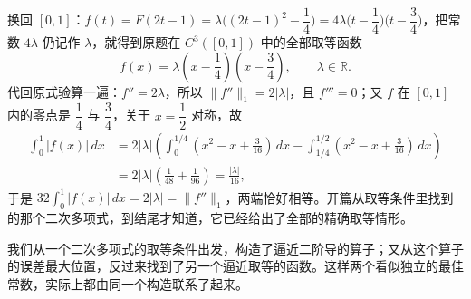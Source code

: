 \documentclass[UTF8,fontset=windows,a4paper,11pt]{ctexart}
\newcommand{\Lone}[1]{\lVert #1\rVert_1}
\begin{document}
换回 $[0,1]$：$f(t)=F(2t-1)=\lambda\bigl((2t-1)^2-\dfrac14\bigr)=4\lambda\bigl(t-\dfrac14\bigr)\bigl(t-\dfrac34\bigr)$，把常数 $4\lambda$ 仍记作 $\lambda$，就得到原题在 $C^3([0,1])$ 中的全部取等函数
\[
    f(x)=\lambda\left(x-\frac14\right)\left(x-\frac34\right),\qquad \lambda\in\mathbb{R}.
\]
代回原式验算一遍：$f''=2\lambda$，所以 $\Lone{f''}=2|\lambda|$，且 $f'''=0$；又 $f$ 在 $[0,1]$ 内的零点是 $\dfrac14$ 与 $\dfrac34$，关于 $x=\dfrac12$ 对称，故
\[
    \begin{aligned}
    \int_{0}^{1}|f(x)|\,dx
    &=2|\lambda|\left(\int_{0}^{1/4}\left(x^2-x+\frac3{16}\right)\,dx
      -\int_{1/4}^{1/2}\left(x^2-x+\frac3{16}\right)\,dx\right)\\
    &=2|\lambda|\left(\frac1{48}+\frac1{96}\right)
    =\frac{|\lambda|}{16},
    \end{aligned}
\]
于是 $32\displaystyle\int_0^1|f(x)|\,dx=2|\lambda|=\Lone{f''}$，两端恰好相等。开篇从取等条件里找到的那个二次多项式，到结尾才知道，它已经给出了全部的精确取等情形。

我们从一个二次多项式的取等条件出发，构造了逼近二阶导的算子；又从这个算子的误差最大位置，反过来找到了另一个逼近取等的函数。这样两个看似独立的最佳常数，实际上都由同一个构造联系了起来。
\end{document}
